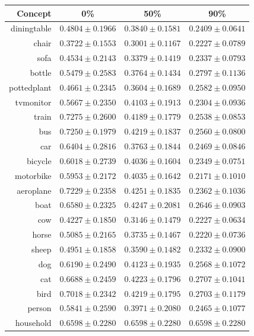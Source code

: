 \documentclass[11pt,a4paper]{book}
\begin{document}
\begin{table}[htbp]
\centering
\begin{tabular}{r|c|c|c}
Concept & 0\% & 50\% & 90\%\\\hline
diningtable   & $0.4804\pm0.1966$ & $0.3840\pm0.1581$ & $0.2409\pm0.0641$\\
chair         & $0.3722\pm0.1553$ & $0.3001\pm0.1167$ & $0.2227\pm0.0789$\\
sofa          & $0.4534\pm0.2143$ & $0.3379\pm0.1419$ & $0.2337\pm0.0793$\\
bottle        & $0.5479\pm0.2583$ & $0.3764\pm0.1434$ & $0.2797\pm0.1136$\\
pottedplant   & $0.4661\pm0.2345$ & $0.3604\pm0.1689$ & $0.2582\pm0.0950$\\
tvmonitor     & $0.5667\pm0.2350$ & $0.4103\pm0.1913$ & $0.2304\pm0.0936$\\
train         & $0.7275\pm0.2600$ & $0.4189\pm0.1779$ & $0.2538\pm0.0853$\\
bus           & $0.7250\pm0.1979$ & $0.4219\pm0.1837$ & $0.2560\pm0.0800$\\
car           & $0.6404\pm0.2816$ & $0.3763\pm0.1844$ & $0.2469\pm0.0846$\\
bicycle       & $0.6018\pm0.2739$ & $0.4036\pm0.1604$ & $0.2349\pm0.0751$\\
motorbike     & $0.5953\pm0.2172$ & $0.4035\pm0.1642$ & $0.2171\pm0.1010$\\
aeroplane     & $0.7229\pm0.2358$ & $0.4251\pm0.1835$ & $0.2362\pm0.1036$\\
boat          & $0.6580\pm0.2325$ & $0.4247\pm0.2081$ & $0.2646\pm0.0903$\\
cow           & $0.4227\pm0.1850$ & $0.3146\pm0.1479$ & $0.2227\pm0.0634$\\
horse         & $0.5085\pm0.2165$ & $0.3735\pm0.1467$ & $0.2220\pm0.0736$\\
sheep         & $0.4951\pm0.1858$ & $0.3590\pm0.1482$ & $0.2332\pm0.0900$\\
dog           & $0.6190\pm0.2490$ & $0.4123\pm0.1935$ & $0.2568\pm0.1072$\\
cat           & $0.6688\pm0.2459$ & $0.4223\pm0.1796$ & $0.2707\pm0.1041$\\
bird          & $0.7018\pm0.2342$ & $0.4219\pm0.1795$ & $0.2703\pm0.1179$\\
person        & $0.5841\pm0.2590$ & $0.3971\pm0.2080$ & $0.2465\pm0.1077$\\\hline
household     & $0.6598\pm0.2280$ & $0.6598\pm0.2280$ & $0.6598\pm0.2280$\\

\end{tabular}
\end{table}
\end{document}
